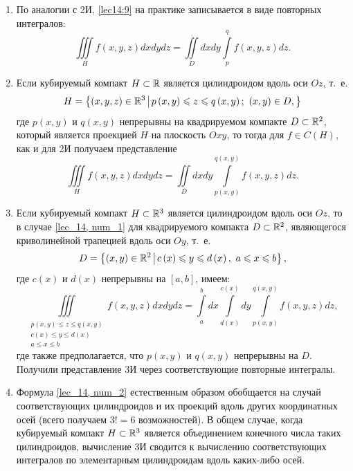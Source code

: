 \documentclass[../../main.tex]{subfiles}
\begin{document}
	\begin{rems}
		\quad
		\begin{enumerate}
			\item По аналогии с 2И, \eqref{lec14:9} на практике записывается в виде 
			повторных 
			интегралов:
			\begin{equation}
			\iiint\limits_{H} f \left( x, y, z \right) dx dy dz = \iint\limits_{D} 
			dx dy \int\limits_{p}^{q} f\left(x, y, 
			z\right) dz. \label{lec_14, num_1}
			\end{equation}
			
			\item Если кубируемый компакт $H \subset \mathbb{R}$ является цилиндроидом вдоль 
			оси $Oz$, 
			т.~е. 
			\[H = \left\{\left(x, y, z \right) \in \R^3 \; \vline \; p \left(x, 
			y\right) \leq z \leq q \left(x, y \right);\  \left(x, y\right) \in D,
			\right\} \]
			где $p\left(x, y\right)$ и $q\left(x, y\right)$ непрерывны на квадрируемом 
			компакте $D \subset \mathbb{R}^2$, который является проекцией $H$ на плоскость 
			$Oxy$, то тогда для $f 
			\in C\left(H\right)$, как и для 2И получаем представление
			\[\iiint\limits_{H} f \left( x, y, z \right) dx dy dz = \iint\limits_{D} 
			dx dy \int\limits_{p\left(x, y\right)}^{q\left(x, y \right)} f\left(x, y, 
			z\right) dz.\]
			
			\item Если кубируемый компакт $H \subset \mathbb{R}^3$ является цилиндроидом вдоль 
			оси 
			$Oz$, то в случае \eqref{lec_14, num_1} для квадрируемого компакта $D 
			\subset \mathbb{R}^2$, являющегося криволинейной трапецией вдоль оси $Oy$, т.~е.
			\[D = \left\{\left(x, y\right) \in \R^2 \; \vline \; c \left(x\right) \leq 
			y \leq d \left(x \right),\ a \leq x \leq b \right\}, \]
			где $c(x)$ и $d(x)$ непрерывны на $\left[a, b\right]$, имеем:
			\begin{equation}
			\iiint\limits_{\substack{
				p\left(x, y\right) \leq z \leq q\left(x, y\right)\\
				c\left(x\right) \leq y \leq d\left(x\right)\\
				a \leq x \leq b
				}} f \left( x, y, z \right) dx dy dz = \int\limits_{a}^{b} dx 
				\int\limits_{d\left(x\right)}^{c\left(x\right)} dy \int\limits_{p\left(x, 
				y\right)}^{q\left(x, y\right)} f(x, y, z) dz, \label{lec_14, num_2}
			\end{equation}
			где также предполагается, что $p\left(x, y\right)$ и $q\left(x, y\right)$ 
			непрерывны на $D$.
			Получили представление 3И через соответствующие повторные интегралы.
			
			\item Формула \eqref{lec_14, num_2} естественным образом обобщается на 
			случай соответствующих цилиндроидов и их проекций вдоль других координатных 
			осей (всего получаем $3! = 6$ возможностей). В общем случае, когда 
			кубируемый компакт $H \subset \mathbb{R}^3$ является объединением конечного числа 
			таких цилиндроидов, вычисление 3И сводится к вычислению соответствующих 
			интегралов по элементарным цилиндроидам вдоль каких-либо осей. 
		\end{enumerate}
	\end{rems}
\end{document}
